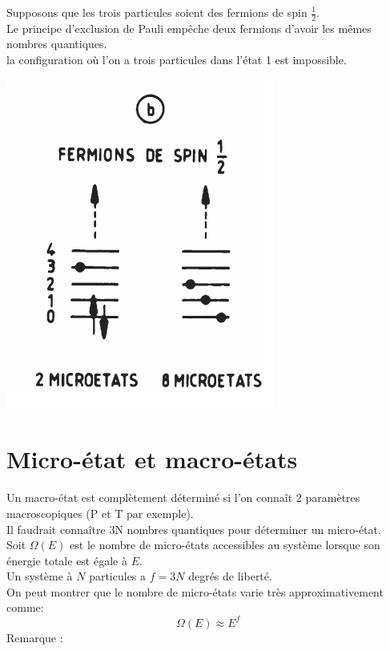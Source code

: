 \documentclass[12pt,oneside]{book}
\begin{document}
\begin{minipage}{0.8\linewidth}
	Supposons que les trois particules soient des fermions de spin $\frac{1}{2}$.\\
	Le principe d'exclusion de Pauli empêche deux fermions d'avoir les mêmes nombres quantiques.\\
	la configuration où l'on a trois particules dans l'état 1 est impossible.

\end{minipage}
\begin{minipage}{0.2\linewidth}
	\includegraphics[width=\linewidth]{../pic/3306/8}
\end{minipage}
\section{Micro-état et macro-états}
Un macro-état est complètement déterminé si l'on connaît 2 paramètres macroscopiques (P et T par exemple).\\
Il faudrait connaître 3N nombres quantiques pour déterminer un micro-état.\\
Soit $\Omega(E)$ est le nombre de micro-états accessibles au système lorsque son énergie totale est égale à $E$.\\
Un système à $N$ particules a $f = 3N$ degrés de liberté.\\
On peut montrer que le nombre de micro-états varie très approximativement comme:
\[\Omega(E)\approx E^f\]
Remarque :
\end{document}
